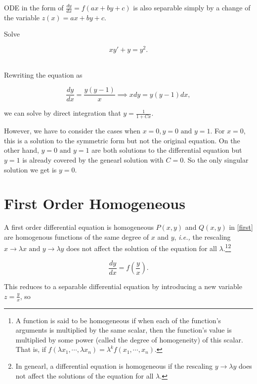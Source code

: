 \documentclass[english,a4paper,12pt]{report}
\begin{document}
ODE in the form of \(\displaystyle \frac{dy}{dx} = f(ax+by+c)\) is also separable simply by a change of the variable \(z(x) = ax + by + c\).

{Solve 

\begin{equation}
    xy'+y=y^2.
\end{equation}~
}
{Rewriting the equation as 

\begin{equation}
    \frac{dy}{dx} = \frac{y(y-1)}{x} \implies xdy = y(y-1)dx,
\end{equation}

we can solve by direct integration that \(\displaystyle y = \frac{1}{1+Cx} \). 

However, we have to consider the cases when \(x = 0, y = 0 \text { and } y = 1\). For \(x = 0\), this is a solution to the symmetric form but not the original equation. On the other hand, \(y=0\text { and } y=1\) are both solutions to the differential equation but \(y = 1\) is already covered by the genearl solution with \(C = 0\). So the only singular solution we get is \(y = 0\).    
} 


\section{First Order Homogeneous} \label{homo} 

A first order differential equation is homogeneous \(P(x,y)\) and \(Q(x,y)\) in \cref{first} are homogenous functions of the same degree of \(x\) and \(y\), \textit{i.e.,} the rescaling \(x \to \lambda x \text { and } y \to \lambda y\) does not affect the solution of the equation for all \(\lambda \).\footnote{A function is said to be homogeneous if when each of the function's arguments is multiplied by the same scalar, then the function's value is multiplied by some power (called the degree of homogeneity) of this scalar. That is, if \(f(\lambda x_1 ,\cdots, \lambda x_{n} ) = \lambda  ^{k} f(x_1 ,\cdots,x_{n} )  \).  }\footnote{In genearl, a differential equation is homogeneous if the rescaling \(y \to  \lambda y\) does not affect the solutions of the equation for all \(\lambda \).} 

\begin{equation}
    \frac{dy}{dx} = f\left(\frac{y}{x} \right).
\end{equation}

This reduces to a separable differential equation by introducing a new variable \(\displaystyle z = \frac{y}{x} \), so
\end{document}
